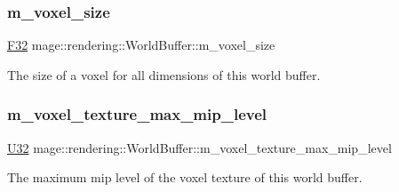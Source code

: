 \subsubsection{\texorpdfstring{m\+\_\+voxel\+\_\+size}{m\_voxel\_size}}
{\footnotesize\ttfamily \hyperlink{namespacemage_aa97e833b45f06d60a0a9c4fc22ae02c0}{F32} mage\+::rendering\+::\+World\+Buffer\+::m\+\_\+voxel\+\_\+size}

The size of a voxel for all dimensions of this world buffer. \hypertarget{structmage_1_1rendering_1_1_world_buffer_af891d0c776313dcf06048d78a2ad4853}{}\label{structmage_1_1rendering_1_1_world_buffer_af891d0c776313dcf06048d78a2ad4853} 
\subsubsection{\texorpdfstring{m\+\_\+voxel\+\_\+texture\+\_\+max\+\_\+mip\+\_\+level}{m\_voxel\_texture\_max\_mip\_level}}
{\footnotesize\ttfamily \hyperlink{namespacemage_a41c104c036fba3756a74e19f793eeaa1}{U32} mage\+::rendering\+::\+World\+Buffer\+::m\+\_\+voxel\+\_\+texture\+\_\+max\+\_\+mip\+\_\+level}

The maximum mip level of the voxel texture of this world buffer. 